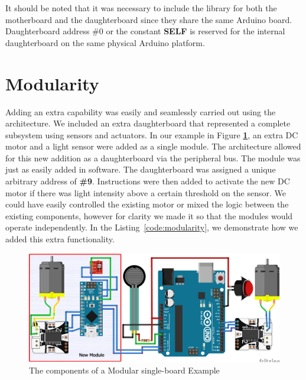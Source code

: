 It should be noted that it was necessary to include the library for both the motherboard and the daughterboard since they share the same Arduino board. Daughterboard address \#0 or the constant \textbf{SELF} is reserved for the internal daughterboard on the same physical Arduino platform.

	\section{Modularity} %
	\label{sec:modularity}
Adding an extra capability was easily and seamlessly carried out using the \xten architecture. We included an extra daughterboard that represented a complete subsystem using sensors and actuators. In our example in Figure \textbf{\ref{fig:modularity}}, an extra DC motor and a light sensor were added as a single module. The \xten architecture allowed for this new addition as a daughterboard via the peripheral bus. The module was just as easily added in software. The daughterboard was assigned a unique arbitrary address of \textbf{\#9}. Instructions were then added to activate the new DC motor if there was light intensity above a certain threshold on the sensor. We could have easily controlled the existing motor or mixed the logic between the existing components, however for clarity we made it so that the modules would operate independently.  In the Listing~\ref{code:modularity}, we demonstrate how we added this extra functionality.

\begin{figure}[h!]
  \begin{center}
    \includegraphics[width=1.0\columnwidth]{Figures/modular-example.pdf}
    \caption{The components of a Modular single-board \xten Example}\label{fig:modularity}
  \end{center}
\end{figure}

